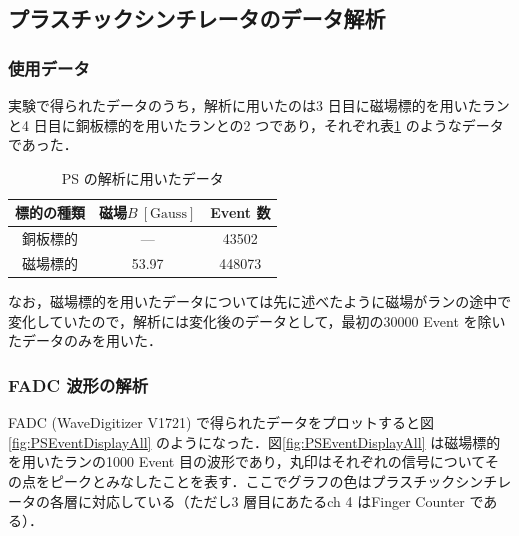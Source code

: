 

%

\subsection{プラスチックシンチレータのデータ解析}
\label{subsec:PSAnalyses}

\subsubsection{使用データ}
\label{subsubsec:PSData}
実験で得られたデータのうち，解析に用いたのは3 日目に磁場標的を用いたランと4 日目に銅板標的を用いたランとの2 つであり，それぞれ表\ref{tab:PSdata} のようなデータであった．
\begin{table}[h]
	\centering
	\caption{PS の解析に用いたデータ}
	\begin{tabular}{ccc} \toprule
	標的の種類 & 磁場$B~[\mathrm{Gauss}]$ & Event 数 \\ \midrule
	銅板標的 & --- & 43502 \\
	磁場標的 & 53.97 & 448073 \\ \bottomrule
	\end{tabular}\label{tab:PSdata}
\end{table}%

なお，磁場標的を用いたデータについては先に述べたように磁場がランの途中で変化していたので，解析には変化後のデータとして，最初の30000 Event を除いたデータのみを用いた．

\subsubsection{FADC 波形の解析}
\label{subsubsec:PSEventDisplay}
FADC (WaveDigitizer V1721) で得られたデータをプロットすると図\ref{fig:PSEventDisplayAll} のようになった．図\ref{fig:PSEventDisplayAll} は磁場標的を用いたランの1000 Event 目の波形であり，丸印はそれぞれの信号についてその点をピークとみなしたことを表す．ここでグラフの色はプラスチックシンチレータの各層に対応している（ただし3 層目にあたるch 4 はFinger Counter である）．

